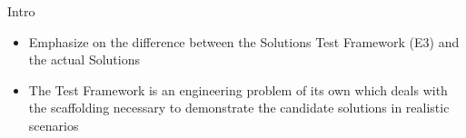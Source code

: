\begin{frame}
\label{notes__000-intro.md}
\makeatletter
\def\fps@figure{h}
\makeatother

\begin{frame}{Intro}
\label{notes__000-intro.md__intro}
\begin{itemize}
\item
  Emphasize on the difference between the Solutions Test Framework (E3) and the actual Solutions
\item
  The Test Framework is an engineering problem of its own which deals with the scaffolding necessary to demonstrate the candidate solutions in realistic scenarios
\end{itemize}
\end{frame}
\end{frame}

